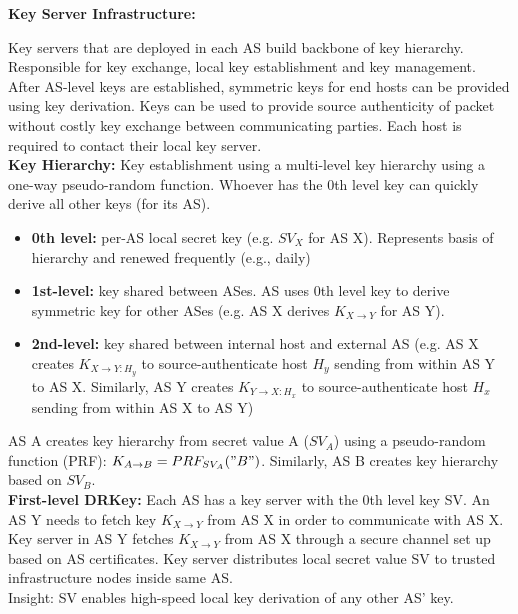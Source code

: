 \documentclass[11pt,oneside,a4paper]{article}
\begin{document}
\noindent \textbf{Key Server Infrastructure:}

\noindent Key servers that are deployed in each AS build backbone of key hierarchy. Responsible for key exchange, local key establishment and key management. After AS-level keys are established, symmetric keys for end hosts can be provided using key derivation. Keys can be used to provide source authenticity of packet without costly key exchange between communicating parties. Each host is required to contact their local key server.\\

\noindent \textbf{Key Hierarchy:} Key establishment using a multi-level key hierarchy using a one-way pseudo-random function. Whoever has the 0th level key can quickly derive all other keys (for its AS).

\vspace{-\topsep}
\begin{itemize}
	\setlength{\itemsep}{0pt}
	\setlength{\parskip}{0pt}
	\item \textbf{0th level:} per-AS local secret key (e.g. $SV_X$ for AS X). Represents basis of hierarchy and renewed frequently (e.g., daily)
	\item \textbf{1st-level:} key shared between ASes. AS uses 0th level key to derive symmetric key for other ASes (e.g. AS X derives $K_{X\rightarrow Y}$ for AS Y).
	\item \textbf{2nd-level:} key shared between internal host and external AS (e.g. AS X creates $K_{X\rightarrow Y:H_y}$ to source-authenticate host $H_y$ sending from within AS Y to AS X. Similarly, AS Y creates $K_{Y\rightarrow X:H_x}$ to source-authenticate host $H_x$ sending from within AS X to AS Y)
\end{itemize}
\vspace{-\topsep}

\noindent AS A creates key hierarchy from secret value A ($SV_A$) using a pseudo-random function (PRF): $K_{A\rightarrow B} = PRF_{SV_A}("B")$. Similarly, AS B creates key hierarchy based on $SV_B$.\\

\noindent \textbf{First-level DRKey:} Each AS has a key server with the 0th level key SV. An AS Y needs to fetch key $K_{X\rightarrow Y}$ from AS X in order to communicate with AS X. Key server in AS Y fetches $K_{X\rightarrow Y}$ from AS X through a secure channel set up based on AS certificates. Key server distributes local secret value SV to trusted infrastructure nodes inside same AS.\\
Insight: SV enables high-speed local key derivation of any other AS’ key.
\end{document}
